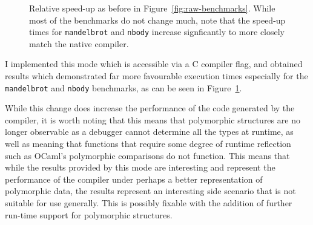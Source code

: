 \begin{figure}
    \centering

    \caption{Relative speed-up as before in Figure~\ref{fig:raw-benchmarks}.
    While most of the benchmarks do not change much, note that the speed-up
    times for \texttt{mandelbrot} and \texttt{nbody} increase signficantly to
    more closely match the native compiler.}\label{fig:benchmarks-no-alloc}
\end{figure}

I implemented this mode which is accessible via a C compiler flag, and obtained
results which demonstrated far more favourable execution times especially for
the \texttt{mandelbrot} and \texttt{nbody} benchmarks, as can be seen in
Figure~\ref{fig:benchmarks-no-alloc}.

While this change does increase the performance of the code generated by the
compiler, it is worth noting that this means that polymorphic structures are no
longer observable as a debugger cannot determine all the types at runtime, as
well as meaning that functions that require some degree of runtime reflection
such as OCaml's polymorphic comparisons do not function. This means that while
the results provided by this mode are interesting and represent the performance
of the compiler under perhaps a better representation of polymorphic data, the
results represent an interesting side scenario that is not suitable for use
generally. This is possibly fixable with the addition of further run-time
support for polymorphic structures.

